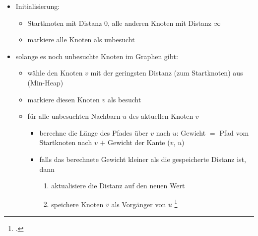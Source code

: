\documentclass{bschlangaul-theorie}
\begin{document}
\begin{itemize}
\item Initialisierung:

\begin{itemize}
\item Startknoten mit Distanz $0$, alle anderen Knoten mit Distanz
$\infty$

\item markiere alle Knoten als unbesucht
\end{itemize}

\item solange es noch unbesuchte Knoten im Graphen gibt:

\begin{itemize}
\item wähle den Knoten $v$ mit der geringsten Distanz (zum Startknoten)
aus (Min-Heap)

\item markiere diesen Knoten $v$ als besucht

\item für alle unbesuchten Nachbarn $u$ des aktuellen Knoten $v$

\begin{itemize}
\item berechne die Länge des Pfades über $v$ nach $u$: Gewicht $=$ Pfad
vom Startknoten nach $v$ $+$ Gewicht der Kante ($v$, $u$)

\item falls das berechnete Gewicht kleiner als die gespeicherte Distanz
ist, dann

\begin{enumerate}
\item aktualisiere die Distanz auf den neuen Wert
\item speichere Knoten $v$ als Vorgänger von $u$
\footcite[Seite 12]{aud:fs:6}
\end{enumerate}
\end{itemize}
\end{itemize}
\end{itemize}


\literatur
\end{document}
